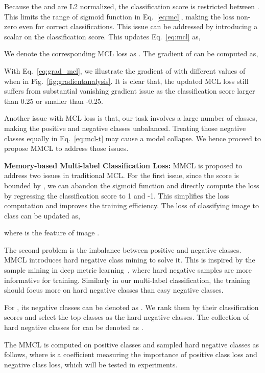 \documentclass[10pt,twocolumn,letterpaper]{article}
\begin{document}
Because the  and  are L2 normalized, the classification score is restricted between . This limits the range of sigmoid function in Eq.~\eqref{eq:mcl}, making the loss non-zero even for correct classifications. This issue can be addressed by introducing a scalar  on the classification score. This updates Eq.~\eqref{eq:mcl} as,

We denote the corresponding MCL loss as . The gradient of  can be computed as,



With Eq.~\eqref{eq:grad_mcl}, we illustrate the gradient of  with different values of  when  in Fig.~\ref{fig:gradientanalysis}. It is clear that, the updated MCL loss still suffers from substantial vanishing gradient issue as the classification score larger than 0.25 or smaller than -0.25.

Another issue with MCL loss is that, our task involves a large number of classes, making the positive and negative classes unbalanced. Treating those negative classes equally in Eq.~\eqref{eq:mcl-t} may cause a model collapse. We hence proceed to propose MMCL to address those issues.

\textbf{Memory-based Multi-label Classification Loss:} MMCL is proposed to address two issues in traditional MCL. For the first issue, since the score is bounded by , we can abandon the sigmoid function and directly compute the loss by regressing the classification score to 1 and -1. This simplifies the loss computation and improves the training efficiency. The loss of classifying image  to class  can be updated as,

where  is the feature of image .

The second problem is the imbalance between positive and negative classes. MMCL introduces hard negative class mining to solve it. This is inspired by the sample mining in deep metric learning~\cite{wu2017sampling}, where hard negative samples are more informative for training. Similarly in our multi-label classification, the training should focus more on hard negative classes than easy negative classes.

For , its negative classes can be denoted as . We rank them by their classification scores and select the top  classes as the hard negative classes. The collection of hard negative classes for  can be denoted as .

The MMCL is computed on positive classes and sampled hard negative classes as follows, 
where  is a coefficient measuring the importance of positive class loss and negative class loss, which will be tested in experiments.
\end{document}
